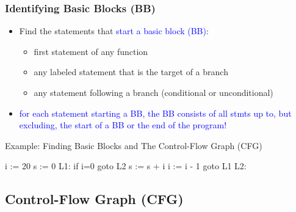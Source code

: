 \documentclass{beamer}
\newcommand{\blue}[1]{\textcolor{Blue}{{#1}}}
\newcommand{\emp}[1]{\textcolor{DikuRed}{ #1}}
\begin{document}
\begin{frame}[fragile,t]
    \frametitle{Identifying Basic Blocks (BB)}


\begin{itemize}

\item Find the statements that \blue{start a basic block (BB)}:\smallskip
    \begin{itemize}
        \item first statement of any function

        \item any labeled statement that is the target of a branch

        \item any statement following a branch (conditional or unconditional)\smallskip
    \end{itemize}


\item \blue{for each statement starting a BB, the BB consists of all stmts up
            to, but excluding, the start of a BB or the end of the program!}

\end{itemize}

\bigskip

\begin{block}{Example: Finding Basic Blocks and The Control-Flow Graph (\textsc{CFG})}
\begin{colorcode}[fontsize=\scriptsize]
    i := 20
    s := 0
L1:
    if i=0 \emp{goto L2}
    s := s + i
    i := i - 1
    \emp{goto L1}
L2:
\end{colorcode} 
\end{block}

\end{frame}


\subsection{Control-Flow Graph (CFG)}
\end{document}
